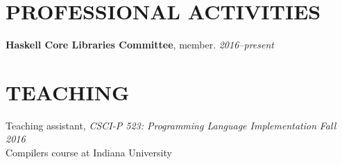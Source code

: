 \documentclass{res}
\begin{document}
\begin{resume}
\section{PROFESSIONAL ACTIVITIES}
    \textbf{Haskell Core Libraries Committee}, member. \hfill \textit{2016--present}

\section{TEACHING}
    Teaching assistant, \textit{CSCI-P 523: Programming Language Implementation} \hfill \textit{Fall 2016} \\
    Compilers course at Indiana University

\end{resume}
\end{document}
